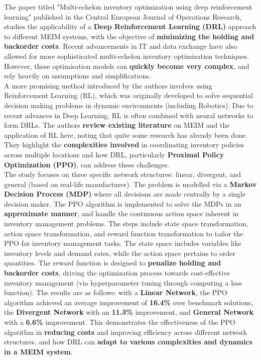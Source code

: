 \documentclass[12pt]{article}
\begin{document}
\noindent The paper titled "Multi-echelon inventory optimization using deep reinforcement learning" \cite{Geevers2023} published in the Central European Journal of Operations Research, studies the applicability of a \textbf{Deep Reinforcement Learning (DRL)} approach to different MEIM systems, with the objective of \textbf{minimizing the holding and backorder costs}. Recent advancements in IT and data exchange have also allowed for more sophisticated multi-echelon inventory optimization techniques. However, these optimisation models can \textbf{quickly become very complex}, and rely heavily on assumptions and simplifications. \\ 

\noindent A more promising method introduced by the authors involves using Reinforcement Learning (RL), which was originally developed to solve sequential decision making problems in dynamic environments (including Robotics). Due to recent advances in Deep Learning, RL is often combined with neural networks to form DRLs. The authors \textbf{review existing literature} on MEIM and the application of RL here, noting that quite some research has already been done. They highlight the \textbf{complexities involved} in coordinating inventory policies across multiple locations and how DRL, particularly \textbf{Proximal Policy Optimization (PPO)}, can address these challenges. \\ 

\noindent The study focuses on three specific network structures: linear, divergent, and general (based on real-life manufacturer). The problem is modelled via a \textbf{Markov Decision Process (MDP)} where all decisions are made centrally by a single decision maker. The PPO algorithm is implemented to solve the MDPs in an \textbf{approximate manner}, and handle the continuous action space inherent in inventory management problems. The steps include state space transformation, action space transformation, and reward function transformation to tailor the PPO for inventory management tasks. The state space includes variables like inventory levels and demand rates, while the action space pertains to order quantities. The reward function is designed to \textbf{penalize holding and backorder costs}, driving the optimization process towards cost-effective inventory management (via hyperparameter tuning through computing a loss function). The results are as follows: with a \textbf{Linear Network}, the PPO algorithm achieved an average improvement of \textbf{16.4\%} over benchmark solutions, the \textbf{Divergent Network} with an \textbf{11.3\%} improvement, and \textbf{General Network} with a \textbf{6.6\%} improvement. This demonstrates the effectiveness of the PPO algorithm in \textbf{reducing costs} and improving efficiency across different network structures, and how DRL can \textbf{adapt to various complexities and dynamics in a MEIM system}. \\ 
\end{document}
